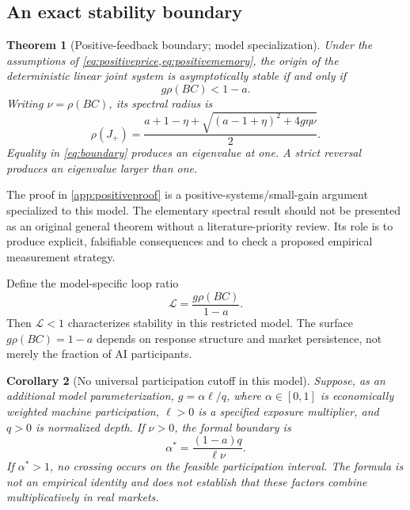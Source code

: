 \documentclass[11pt,a4paper]{article}
\newtheorem{theorem}{Theorem}[section]
\newtheorem{corollary}[theorem]{Corollary}
\theoremstyle{definition}
\theoremstyle{remark}
\begin{document}
\subsection{An exact stability boundary}
\begin{theorem}[Positive-feedback boundary; model specialization]
\label{thm:positive}
Under the assumptions of \cref{eq:positiveprice,eq:positivememory}, the origin of the deterministic linear joint system is asymptotically stable if and only if
\begin{equation}
 g\rho(BC)<1-a.
 \label{eq:boundary}
\end{equation}
Writing $\nu=\rho(BC)$, its spectral radius is
\begin{equation}
 \rho(J_+)=\frac{a+1-\eta+
 \sqrt{(a-1+\eta)^2+4g\eta\nu}}{2}.
 \label{eq:networkradius}
\end{equation}
Equality in \cref{eq:boundary} produces an eigenvalue at one. A strict reversal produces an eigenvalue larger than one.
\end{theorem}
The proof in \cref{app:positiveproof} is a positive-systems/small-gain argument specialized to this model. The elementary spectral result should not be presented as an original general theorem without a literature-priority review. Its role is to produce explicit, falsifiable consequences and to check a proposed empirical measurement strategy.

Define the model-specific loop ratio
\begin{equation}
 \mathcal L=\frac{g\rho(BC)}{1-a}.
 \label{eq:loopratio}
\end{equation}
Then $\mathcal L<1$ characterizes stability in this restricted model. The surface $g\rho(BC)=1-a$ depends on response structure and market persistence, not merely the fraction of AI participants.

\begin{corollary}[No universal participation cutoff in this model]
\label{cor:participation}
Suppose, as an additional model parameterization, $g=\alpha\ell/q$, where $\alpha\in[0,1]$ is economically weighted machine participation, $\ell>0$ is a specified exposure multiplier, and $q>0$ is normalized depth. If $\nu>0$, the formal boundary is
\begin{equation}
 \alpha^*=\frac{(1-a)q}{\ell\nu}.
 \label{eq:alphastar}
\end{equation}
If $\alpha^*>1$, no crossing occurs on the feasible participation interval. The formula is not an empirical identity and does not establish that these factors combine multiplicatively in real markets.
\end{corollary}
\end{document}

